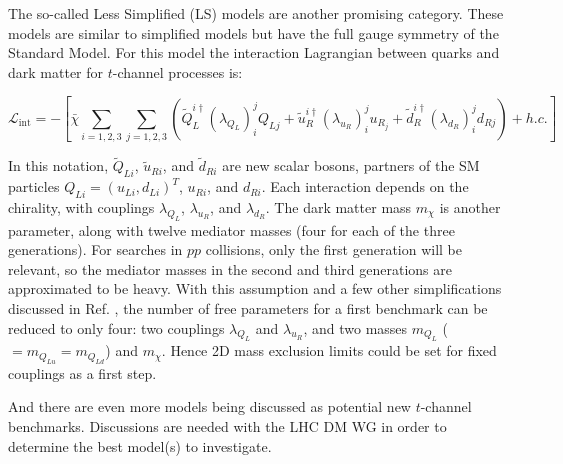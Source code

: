 The so-called Less Simplified (LS) models \cite{Ko:2016zxg} are another promising category. These models are similar to simplified models but have the full gauge symmetry of the Standard Model. For this model the interaction Lagrangian between quarks and dark matter for $t$-channel processes is:

\begin{equation}
\mathcal{L}_\text{int} = - \left[ \bar{\chi} \sum_{i=1,2,3} \sum_{j=1,2,3} \left( \tilde{Q}_L^{i\dagger}(\lambda_{Q_L})_i^j Q_{Lj} + \tilde{u}_R^{i\dagger} (\lambda_{u_R})_i^j u_{R_j} + \tilde{d}_R^{i\dagger} (\lambda_{d_R})_i^j d_{Rj} \right) + h.c. \right]
\end{equation}

\noindent In this notation, $\tilde{Q}_{Li}$, $\tilde{u}_{Ri}$, and $\tilde{d}_{Ri}$ are new scalar bosons, partners of the SM particles $Q_{Li} = (u_{Li},d_{Li})^T$, $u_{Ri}$, and $d_{Ri}$. Each interaction depends on the chirality, with couplings $\lambda_{Q_L}$, $\lambda_{u_R}$, and $\lambda_{d_R}$. The dark matter mass $m_\chi$ is another parameter, along with twelve mediator masses (four for each of the three generations). For searches in $pp$ collisions, only the first generation will be relevant, so the mediator masses in the second and third generations are approximated to be heavy. With this assumption and a few other simplifications discussed in Ref. \cite{Ko:2016zxg}, the number of free parameters for a first benchmark can be reduced to only four: two couplings $\lambda_{Q_L}$ and $\lambda_{u_R}$, and two masses $m_{Q_L}$ ($= m_{Q_{Lu}} = m_{Q_{Ld}}$) and $m_\chi$. Hence 2D mass exclusion limits could be set for fixed couplings as a first step.

And there are even more models \cite{Bauer:2017fsw} being discussed as potential new $t$-channel benchmarks. Discussions are needed with the LHC DM WG in order to determine the best model(s) to investigate.

